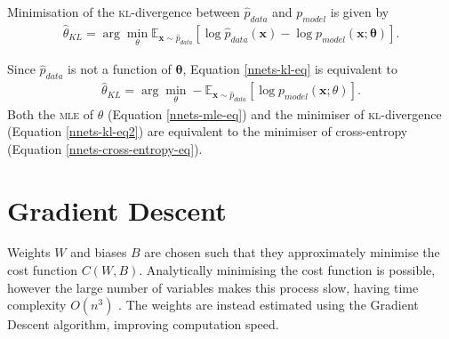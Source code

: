 Minimisation of the \textsc{kl}-divergence between $\hat{p}_{data}$ and $p_{model}$ is given by
\begin{align}\label{nnets-kl-eq}
	\hat{\theta}_{KL} = \arg\min_\theta\mathbb{E}_{\mathbf{x}\sim\hat{p}_{data}}\left[\log \hat{p}_{data}(\mathbf{x}) - \log p_{model}(\mathbf{x};\mathbf{\theta})\right].
\end{align}

Since $\hat{p}_{data}$ is not a function of $\mathbf{\theta}$, Equation \eqref{nnets-kl-eq} is equivalent to 
\begin{align}\label{nnets-kl-eq2}
	\hat\theta_{KL} = \arg\min_\theta-\mathbb{E}_{\mathbf{x}\sim\hat{p}_{data}}\left[\log p_{model}(\mathbf{x};\theta)\right].
\end{align}
Both the \textsc{mle} of $\theta$ (Equation \eqref{nnets-mle-eq}) and the minimiser of \textsc{kl}-divergence (Equation \eqref{nnets-kl-eq2}) are equivalent to the minimiser of cross-entropy (Equation \eqref{nnets-cross-entropy-eq}). 






\section{Gradient Descent}\label{nnets-graddesc}

Weights $W$ and biases $B$ are chosen such that they approximately minimise the cost function $C(W,B)$. Analytically minimising the cost function is possible, however the large number of variables makes this process slow, having time complexity $O(n^3)$ \cite{Marquardt1963}. The weights are instead estimated using the Gradient Descent algorithm, improving computation speed.

